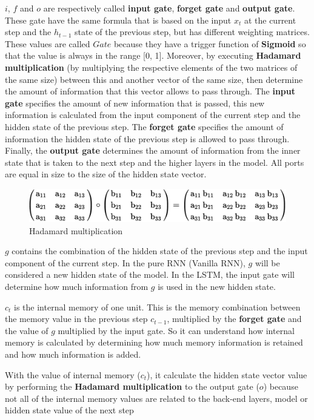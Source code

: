 $i$, $f$ and $o$ are respectively called \textbf{input gate}, \textbf{forget gate} and \textbf{output gate}. These gate have the same formula that is based on the input $x_{t}$ at the current step and the $h_{t-1}$ state of the previous step, but has different weighting matrices. These values are called $Gate$ because they have a trigger function of \textbf{Sigmoid} so that the value is always in the range [0, 1]. Moreover, by executing \textbf{Hadamard multiplication} (by multiplying the respective elements of the two matrices of the same size) between this and another vector of the same size, then determine the amount of information that this vector allows to pass through. The \textbf{input gate} specifies the amount of new information that is passed, this new information is calculated from the input component of the current step and the hidden state of the previous step. The \textbf{forget gate} specifies the amount of information the hidden state of the previous step is allowed to pass through. Finally, the \textbf{output gate} determines the amount of information from the inner state that is taken to the next step and the higher layers in the model. All ports are equal in size to the size of the hidden state vector.
\begin{center}
  \begin{figure}[H]
  \centering
  \includegraphics[width=0.8\columnwidth]{images/chap2/Hadamard.png}
  \caption{Hadamard multiplication}
  \label{chap2:WSP}
  \end{figure}
\end{center}

$g$ contains the combination of the hidden state of the previous step and the input component of the current step. In the pure RNN (Vanilla RNN), $g$ will be considered a new hidden state of the model. In the LSTM, the input gate will determine how much information from $g$ is used in the new hidden state.

$c_{t}$ is the internal memory of one unit. This is the memory combination between the memory value in the previous step $c_{t-1}$, multiplied by the \textbf{forget gate} and the value of $g$ multiplied by the input gate. So it can understand how internal memory is calculated by determining how much memory information is retained and how much information is added.

With the value of internal memory ($c_{t}$), it calculate the hidden state vector value by performing the \textbf{Hadamard multiplication} to the output gate ($o$) because not all of the internal memory values are related to the back-end layers, model or hidden state value of the next step



